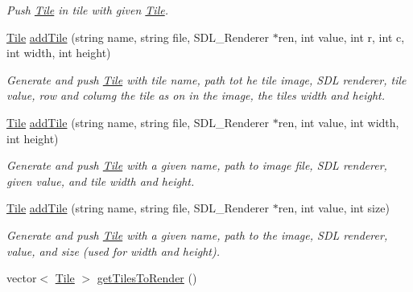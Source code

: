 \begin{DoxyCompactItemize}
\begin{DoxyCompactList}\small\item\em Push \hyperlink{classTile}{Tile} in tile with given \hyperlink{classTile}{Tile}. \end{DoxyCompactList}\item 
\hyperlink{classTile}{Tile} \hyperlink{classTilesettmp_ad7fb8820db0122fbccfdfd53b6069b12}{add\+Tile} (string name, string file, S\+D\+L\+\_\+\+Renderer $\ast$ren, int value, int r, int c, int width, int height)\hypertarget{classTilesettmp_ad7fb8820db0122fbccfdfd53b6069b12}{}\label{classTilesettmp_ad7fb8820db0122fbccfdfd53b6069b12}

\begin{DoxyCompactList}\small\item\em Generate and push \hyperlink{classTile}{Tile} with tile name, path tot he tile image, S\+DL renderer, tile value, row and columg the tile as on in the image, the tiles width and height. \end{DoxyCompactList}\item 
\hyperlink{classTile}{Tile} \hyperlink{classTilesettmp_a21e37b1c5ebcf04d959c740addf82aa4}{add\+Tile} (string name, string file, S\+D\+L\+\_\+\+Renderer $\ast$ren, int value, int width, int height)\hypertarget{classTilesettmp_a21e37b1c5ebcf04d959c740addf82aa4}{}\label{classTilesettmp_a21e37b1c5ebcf04d959c740addf82aa4}

\begin{DoxyCompactList}\small\item\em Generate and push \hyperlink{classTile}{Tile} with a given name, path to image file, S\+DL renderer, given value, and tile width and height. \end{DoxyCompactList}\item 
\hyperlink{classTile}{Tile} \hyperlink{classTilesettmp_a55eccc5b5873118b15a170ad2e0df06d}{add\+Tile} (string name, string file, S\+D\+L\+\_\+\+Renderer $\ast$ren, int value, int size)\hypertarget{classTilesettmp_a55eccc5b5873118b15a170ad2e0df06d}{}\label{classTilesettmp_a55eccc5b5873118b15a170ad2e0df06d}

\begin{DoxyCompactList}\small\item\em Generate and push \hyperlink{classTile}{Tile} with a given name, path to the image, S\+DL renderer, value, and size (used for width and height). \end{DoxyCompactList}\item 
vector$<$ \hyperlink{classTile}{Tile} $>$ \hyperlink{classTilesettmp_a99a1f05beb538a6ea418000775981b9d}{get\+Tiles\+To\+Render} ()\hypertarget{classTilesettmp_a99a1f05beb538a6ea418000775981b9d}{}\label{classTilesettmp_a99a1f05beb538a6ea418000775981b9d}


\end{DoxyCompactItemize}
